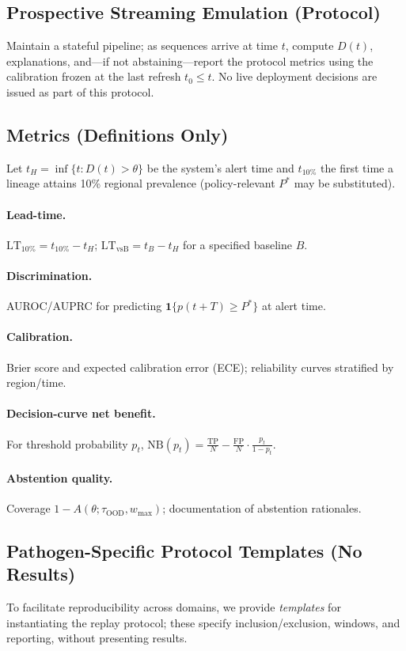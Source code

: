 \documentclass[11pt]{article}
\begin{document}
\subsection{Prospective Streaming Emulation (Protocol)}
Maintain a stateful pipeline; as sequences arrive at time $t$, compute $D(t)$, explanations, and—if not abstaining—report the protocol metrics using the calibration frozen at the last refresh $t_0\le t$. No live deployment decisions are issued as part of this protocol.

\subsection{Metrics (Definitions Only)}
\label{sec:metrics}
Let $t_H=\inf\{t: D(t)>\theta\}$ be the system’s alert time and $t_{10\%}$ the first time a lineage attains 10\% regional prevalence (policy-relevant $P^*$ may be substituted).
\paragraph{Lead-time.}
$\mathrm{LT}_{10\%}=t_{10\%}-t_H$; $\mathrm{LT}_{\text{vsB}}=t_B-t_H$ for a specified baseline $B$.
\paragraph{Discrimination.}
AUROC/AUPRC for predicting $\mathbf{1}\{p(t{+}T)\ge P^*\}$ at alert time.
\paragraph{Calibration.}
Brier score and expected calibration error (ECE); reliability curves stratified by region/time.
\paragraph{Decision-curve net benefit.}
For threshold probability $p_t$,
$\mathrm{NB}(p_t)=\frac{\mathrm{TP}}{N}-\frac{\mathrm{FP}}{N}\cdot\frac{p_t}{1-p_t}$.
\paragraph{Abstention quality.}
Coverage $1-A(\theta;\tau_{\text{OOD}},w_{\max})$; documentation of abstention rationales.

\subsection{Pathogen-Specific Protocol Templates (No Results)}
To facilitate reproducibility across domains, we provide \emph{templates} for instantiating the replay protocol; these specify inclusion/exclusion, windows, and reporting, without presenting results.
\end{document}

